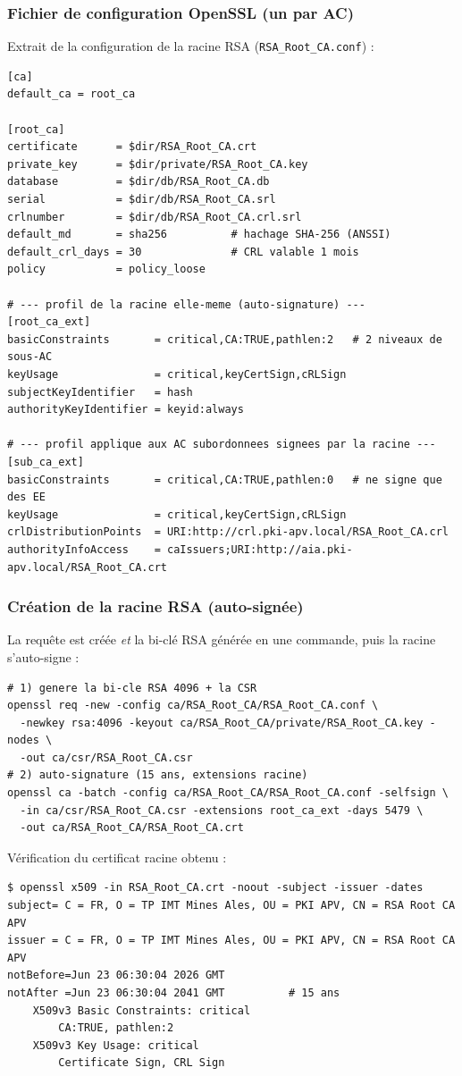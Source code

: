 \documentclass[11pt,a4paper]{article}
\newcommand{\fichier}[1]{\texttt{#1}}
\begin{document}
\subsubsection{Fichier de configuration OpenSSL (un par AC)}
Extrait de la configuration de la
racine RSA (\fichier{RSA\_Root\_CA.conf}) :
\begin{lstlisting}[style=conf]
[ca]
default_ca = root_ca

[root_ca]
certificate      = $dir/RSA_Root_CA.crt
private_key      = $dir/private/RSA_Root_CA.key
database         = $dir/db/RSA_Root_CA.db
serial           = $dir/db/RSA_Root_CA.srl
crlnumber        = $dir/db/RSA_Root_CA.crl.srl
default_md       = sha256          # hachage SHA-256 (ANSSI)
default_crl_days = 30              # CRL valable 1 mois
policy           = policy_loose

# --- profil de la racine elle-meme (auto-signature) ---
[root_ca_ext]
basicConstraints       = critical,CA:TRUE,pathlen:2   # 2 niveaux de sous-AC
keyUsage               = critical,keyCertSign,cRLSign
subjectKeyIdentifier   = hash
authorityKeyIdentifier = keyid:always

# --- profil applique aux AC subordonnees signees par la racine ---
[sub_ca_ext]
basicConstraints       = critical,CA:TRUE,pathlen:0   # ne signe que des EE
keyUsage               = critical,keyCertSign,cRLSign
crlDistributionPoints  = URI:http://crl.pki-apv.local/RSA_Root_CA.crl
authorityInfoAccess    = caIssuers;URI:http://aia.pki-apv.local/RSA_Root_CA.crt
\end{lstlisting}

\subsubsection{Création de la racine RSA (auto-signée)}
La requête est créée \emph{et} la bi-clé RSA générée en une commande, puis la racine
s'auto-signe :
\begin{lstlisting}[style=cmd]
# 1) genere la bi-cle RSA 4096 + la CSR
openssl req -new -config ca/RSA_Root_CA/RSA_Root_CA.conf \
  -newkey rsa:4096 -keyout ca/RSA_Root_CA/private/RSA_Root_CA.key -nodes \
  -out ca/csr/RSA_Root_CA.csr
# 2) auto-signature (15 ans, extensions racine)
openssl ca -batch -config ca/RSA_Root_CA/RSA_Root_CA.conf -selfsign \
  -in ca/csr/RSA_Root_CA.csr -extensions root_ca_ext -days 5479 \
  -out ca/RSA_Root_CA/RSA_Root_CA.crt
\end{lstlisting}
Vérification du certificat racine obtenu :
\begin{lstlisting}[style=out]
$ openssl x509 -in RSA_Root_CA.crt -noout -subject -issuer -dates
subject= C = FR, O = TP IMT Mines Ales, OU = PKI APV, CN = RSA Root CA APV
issuer = C = FR, O = TP IMT Mines Ales, OU = PKI APV, CN = RSA Root CA APV
notBefore=Jun 23 06:30:04 2026 GMT
notAfter =Jun 23 06:30:04 2041 GMT          # 15 ans
    X509v3 Basic Constraints: critical
        CA:TRUE, pathlen:2
    X509v3 Key Usage: critical
        Certificate Sign, CRL Sign
\end{lstlisting}
\end{document}
